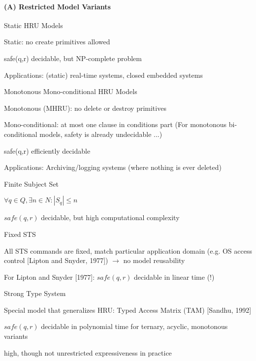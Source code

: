 \documentclass[a4paper]{article}
\begin{document}
\begin{multicols}{3}
    \paragraph{(A) Restricted Model Variants}
    Static HRU Models
    \begin{itemize*}
        \item Static: no create primitives allowed
        \item safe(q,r) decidable, but NP-complete problem
        \item Applications: (static) real-time systems, closed embedded systems
    \end{itemize*}

    Monotonous Mono-conditional HRU Models
    \begin{itemize*}
        \item Monotonous (MHRU): no delete or destroy primitives
        \item Mono-conditional: at most one clause in conditions part (For monotonous bi-conditional models, safety is already undecidable ...)
        \item safe(q,r) efficiently decidable
        \item Applications: Archiving/logging systems (where nothing is ever deleted)
    \end{itemize*}

    Finite Subject Set
    \begin{itemize*}
        \item $\forall q\in Q,\exists n\in N: |S_q|\leq n$
        \item $safe(q,r)$ decidable, but high computational complexity
    \end{itemize*}

    Fixed STS
    \begin{itemize*}
        \item All STS commands are fixed, match particular application domain (e.g. OS access control [Lipton and Snyder, 1977]) $\rightarrow$  no model reusability
        \item For Lipton and Snyder [1977]: $safe(q,r)$ decidable in linear time (!)
    \end{itemize*}

    Strong Type System
    \begin{itemize*}
        \item Special model that generalizes HRU: Typed Access Matrix (TAM) [Sandhu, 1992]
        \item $safe(q,r)$ decidable in polynomial time for ternary, acyclic, monotonous variants
        \item high, though not unrestricted expressiveness in practice
    \end{itemize*}


\end{multicols}
\end{document}

